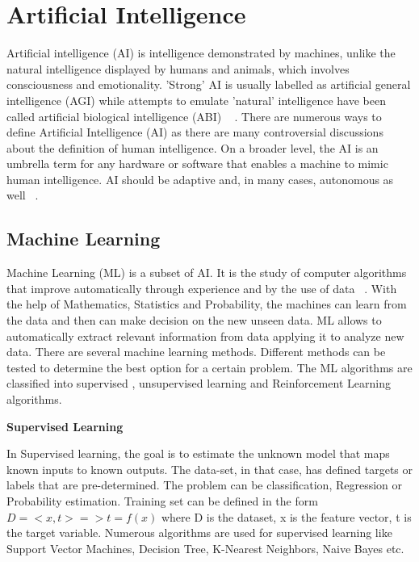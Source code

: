 \section{Artificial Intelligence}
Artificial intelligence (AI) is intelligence demonstrated by machines, unlike the natural intelligence displayed by humans and animals, which involves consciousness and emotionality. 'Strong' AI is usually labelled as artificial general intelligence (AGI) while attempts to emulate 'natural' intelligence have been called artificial biological intelligence (ABI) ~\cite{poole1998computational} .
There are numerous ways to define Artificial Intelligence (AI) as there are many controversial discussions about the definition of human intelligence. On a broader level, the AI is an umbrella term for any hardware or software that enables a machine to mimic human intelligence. AI should be adaptive and, in many cases, autonomous as well ~\cite{touger2020}.
\subsection{Machine Learning}

Machine Learning (ML) is a subset of AI. It is the study of computer algorithms that improve automatically through experience and by the use of data ~\cite{mitchell1997machine}. With the help of Mathematics, Statistics and Probability, the machines can learn from the data and then can make decision on the new unseen data. ML allows to automatically extract relevant information from data applying it to analyze new data.
There are several machine learning methods. Different methods can be tested to determine the best option for a certain problem. The ML algorithms are classified into supervised , unsupervised learning and Reinforcement Learning algorithms.
\newline

\noindent \textbf{Supervised Learning}
\newline

\noindent In Supervised learning, the goal is to estimate the unknown model that maps known inputs to known outputs. The data-set, in that case, has defined targets or labels that are pre-determined. The problem can be classification, Regression or Probability estimation. Training set can be defined in the form \( D = {<x,t>} => t = f(x)  \) where D is the dataset, x is the feature vector, t is the target variable. Numerous algorithms are used for supervised learning like Support Vector Machines, Decision Tree, K-Nearest Neighbors, Naive Bayes etc. 
\newline

